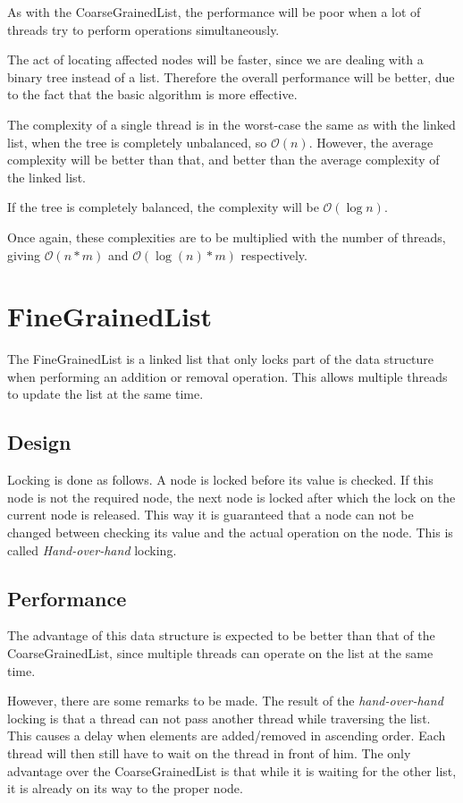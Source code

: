 \documentclass[a4paper]{article}
\def\bigoh{\mathcal{O}}
\begin{document}
As with the CoarseGrainedList, the performance will be poor when a lot of
threads try to perform operations simultaneously.

The act of locating affected nodes will be faster, since we are dealing
with a binary tree instead of a list. Therefore the overall performance
will be better, due to the fact that the basic algorithm is more effective.

The complexity of a single thread is in the worst-case the same as with the
linked list, when the tree is completely unbalanced, so $\bigoh(n)$.
However, the average complexity will be better than that, and better than the
average complexity of the linked list.

If the tree is completely balanced, the complexity will be
$\bigoh(\log n)$.

Once again, these complexities are to be multiplied with the number of
threads, giving $\bigoh(n * m)$ and $\bigoh(\log(n) * m)$
respectively.

\section{FineGrainedList}

The FineGrainedList is a linked list that only locks part of the data
structure when performing an addition or removal operation. This allows
multiple threads to update the list at the same time.

\subsection{Design}

Locking is done as follows. A node is locked before its value is checked.
If this node is not the required node, the next node is locked after which the
lock on the current node is released. This way it is guaranteed that a node
can not be changed between checking its value and the actual operation on the
node. This is called \emph{Hand-over-hand} locking.

\subsection{Performance}

The advantage of this data structure is expected to be better than that of the
CoarseGrainedList, since multiple threads can operate on the list at the same
time.

However, there are some remarks to be made. The result of the 
\emph{hand-over-hand} locking is that a thread can not pass another thread
while traversing the list. This causes a delay when elements are added/removed
in ascending order. Each thread will then still have to wait on the thread in
front of him. The only advantage over the CoarseGrainedList is that while
it is waiting for the other list, it is already on its way to the proper node.
\end{document}
